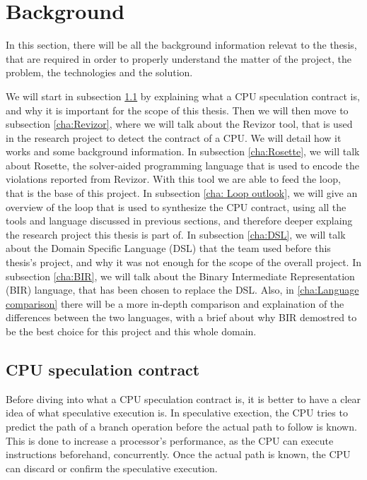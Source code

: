 \chapter{Background}
\label{cha:background}

In this section, there will be all the background information relevat to the thesis,
that are required in order to properly understand the matter of the project, the
problem, the technologies and the solution.

We will start in subsection \ref{cha:CPU speculation contract} by explaining
what a CPU speculation contract is, and why it is important for the scope of this
thesis. Then we will then move to subsection \ref{cha:Revizor}, where we will talk
about the Revizor tool, that is used in the research project to detect the
contract of a CPU. We will detail how it works and some background information.
In subsection \ref{cha:Rosette}, we will talk about Rosette, the solver-aided
programming language that is used to encode the violations reported from Revizor.
With this tool we are able to feed the loop, that is the base of this project. In
subsection \ref{cha: Loop outlook}, we will give an overview of the loop that is
used to synthesize the CPU contract, using all the tools and language discussed in
previous sections, and therefore deeper explaing the research project this
thesis is part of. In subsection \ref{cha:DSL}, we will talk about the Domain
Specific Language (DSL) that the team used before this thesis's project, and why
it was not enough for the scope of the overall project. In subsection
\ref{cha:BIR}, we will talk about the Binary Intermediate Representation (BIR) language,
that has been chosen to replace the DSL. Also, in \ref{cha:Language comparison}
there will be a more in-depth comparison and explaination of the differences
between the two languages, with a brief about why BIR demostred to be the best choice
for this project and this whole domain.

\section{CPU speculation contract}
\label{cha:CPU speculation contract} Before diving into what a CPU speculation contract
is, it is better to have a clear idea of what speculative execution is. In speculative
exection, the CPU tries to predict the path of a branch operation before the
actual path to follow is known. This is done to increase a processor's performance,
as the CPU can execute instructions beforehand, concurrently. Once the actual
path is known, the CPU can discard or confirm the speculative execution.

